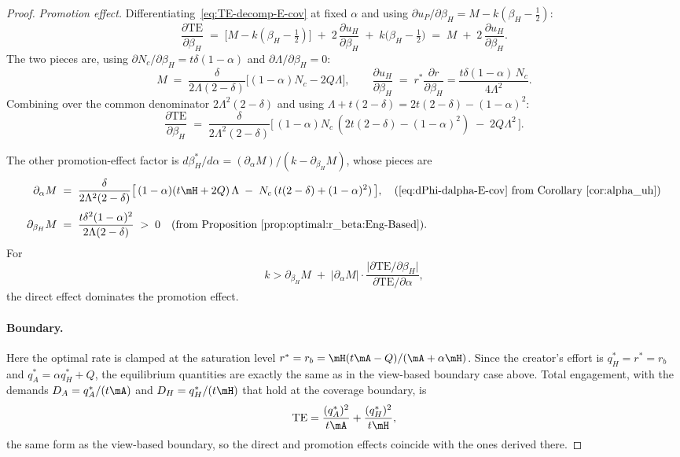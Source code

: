 \begin{proof}
\medskip
\textit{Promotion effect.}\;
Differentiating~\eqref{eq:TE-decomp-E-cov} at fixed $\alpha$ and using
$\partial u_P/\partial\beta_H = M - k(\beta_H - \tfrac12)$:
\begin{equation}\label{eq:dTE-dbeta-E-cov-form}
\frac{\partial\text{TE}}{\partial\beta_H}
\;=\; \bigl[M - k(\beta_H - \tfrac12)\bigr]
\;+\; 2\,\frac{\partial u_H}{\partial\beta_H}
\;+\; k\bigl(\beta_H - \tfrac12\bigr)
\;=\;M\;+\; 2\,\frac{\partial u_H}{\partial\beta_H}.
\end{equation}
The two pieces are, using $\partial N_c/\partial\beta_H = t\delta(1-\alpha)$
and $\partial\Lambda/\partial\beta_H = 0$:
\[
M
\;=\; \frac{\delta}{2\Lambda (2-\delta)}\bigl[(1-\alpha)N_c - 2Q\Lambda\bigr],
\qquad
\frac{\partial u_H}{\partial\beta_H}
\;=\; r^* \frac{\partial r}{\partial \beta_H} =  \frac{t\delta(1-\alpha)\,N_c}{4\Lambda^2}.
\]
Combining over the common denominator $2\Lambda^2 (2-\delta)$ and using
$\Lambda + t(2-\delta) = 2t(2-\delta) - (1-\alpha)^2$:
\begin{equation}\label{eq:dTE-dbeta-E-cov}
\frac{\partial\text{TE}}{\partial\beta_H}
\;=\; \frac{\delta}{2\Lambda^2 (2-\delta)}
\bigl[\,(1-\alpha)N_c\,(2t(2-\delta) - (1-\alpha)^2) \;-\; 2Q\Lambda^2\,\bigr].
\end{equation}

The other promotion-effect factor is $d\beta_H^*/d\alpha
= (\partial_\alpha M)/
(k - \partial_{\beta_H}M)$, whose pieces are
\begin{align*}
\partial_\alpha M
&\;=\; \frac{\delta}{2\Lambda^2 (2-\delta)}\bigl[\,(1-\alpha)(t\mH + 2Q)\,\Lambda
   \;-\; N_c\,(t(2-\delta) + (1-\alpha)^2)\,\bigr],\quad (\text{\eqref{eq:dPhi-dalpha-E-cov} from Corollary~\ref{cor:alpha_uh}})\\[3pt]
\partial_{\beta_H}M
&\;=\; \frac{t\delta^2(1-\alpha)^2}{2\Lambda (2-\delta)}
\;>\; 0
\quad (\text{from Proposition~\ref{prop:optimal:r_beta:Eng-Based}}).
\end{align*}
For
\begin{equation}\label{eq:kbar-alpha-TE-E-cov}
k> \partial_{\beta_H}M
\;+\; \bigl|\partial_\alpha M\bigr|\cdot
\frac{\bigl|\partial\text{TE}/\partial\beta_H\bigr|}
{\partial\text{TE}/\partial\alpha},
\end{equation}
the direct effect dominates the promotion effect. 


\medskip
\paragraph{Boundary.}\;
Here the optimal rate is clamped at the saturation level
$r^* = r_b = \mH(t\mA - Q)/(\mA+\alpha\mH)$. Since the creator's effort
is $q_H^* = r^* = r_b$ and $q_A^* = \alpha q_H^* + Q$, the equilibrium
quantities are exactly the same as in the view-based boundary case
above. Total engagement, with the demands $D_A = q_A^*/(t\mA)$ and
$D_H = q_H^*/(t\mH)$ that hold at the coverage boundary, is
\[
\text{TE} = \frac{(q_A^*)^2}{t\mA} + \frac{(q_H^*)^2}{t\mH},
\]
the same form as the view-based boundary, so the direct and promotion
effects coincide with the ones derived there.


\end{proof}
